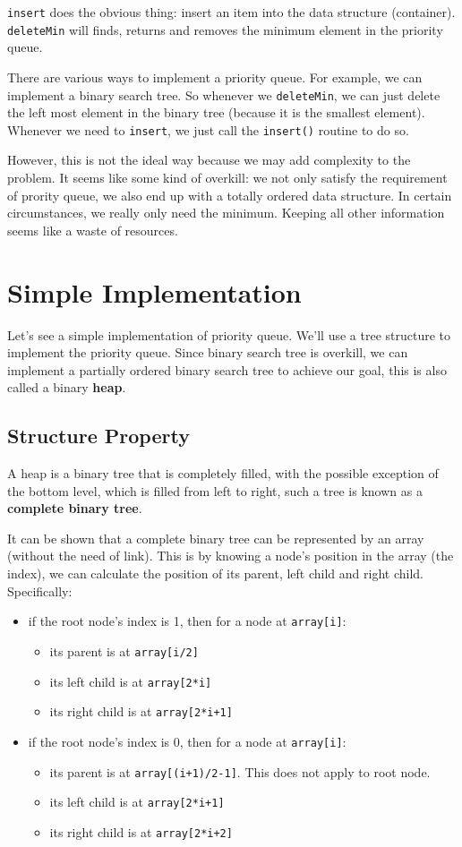 \documentclass[11pt]{book}
\begin{document}
\texttt{insert} does the obvious thing: insert an item into the data structure (container).
\texttt{deleteMin} will finds, returns and removes the minimum element in the priority queue.

There are various ways to implement a priority queue. For example, we can implement a binary search tree. So whenever we \texttt{deleteMin}, we can just delete the left most element in the binary tree (because it is the smallest element). Whenever we need to \texttt{insert}, we just call the \texttt{insert()} routine to do so.

However, this is not the ideal way because we may add complexity to the problem. It seems like some kind of overkill: we not only satisfy the requirement of prority queue, we also end up with a totally ordered data structure. In certain circumstances, we really only need the minimum. Keeping all other information seems like a waste of resources.
\section{Simple Implementation}
\label{sec:org178665c}
Let's see a simple implementation of priority queue. We'll use a tree structure to implement the priority queue. Since binary search tree is overkill, we can implement a partially ordered binary search tree to achieve our goal, this is also called a binary \textbf{heap}.
\subsection{Structure Property}
\label{sec:orge319acf}

A heap is a binary tree that is completely filled, with the possible exception of the bottom level, which is filled from left to right, such a tree is known as a \textbf{complete binary tree}.

It can be shown that a complete binary tree can be represented by an array (without the need of link). This is by knowing a node's position in the array (the index), we can calculate the position of its parent, left child and right child. Specifically:
\begin{itemize}
\item if the root node's index is 1, then for a node at \texttt{array[i]}:
\begin{itemize}
\item its parent is at \texttt{array[i/2]}
\item its left child is at \texttt{array[2*i]}
\item its right child is at \texttt{array[2*i+1]}
\end{itemize}
\item if the root node's index is 0, then for a node at \texttt{array[i]}:
\begin{itemize}
\item its parent is at \texttt{array[(i+1)/2-1]}. This does not apply to root node.
\item its left child is at \texttt{array[2*i+1]}
\item its right child is at \texttt{array[2*i+2]}
\end{itemize}
\end{itemize}
\end{document}
